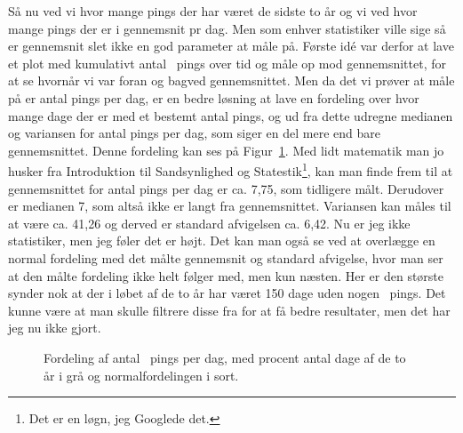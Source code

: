 \documentclass{article}
\newlength\myheight
\newlength\mydepth
\newcommand*\inlinegraphics[1]{%
  \settototalheight\myheight{Xygp}%
  \settodepth\mydepth{Xygp}%
  \raisebox{-\mydepth}{\texttt{[image: \#1]}}%
}
\newcommand{\coffee}[0]{\inlinegraphics{coffee.png}}
\begin{document}
Så nu ved vi hvor mange pings der har været de sidste to år og vi ved hvor mange pings der er i gennemsnit pr dag. Men som enhver statistiker ville sige så er gennemsnit slet ikke en god parameter at måle på.
Første idé var derfor at lave et plot med kumulativt antal \coffee\ pings over tid og måle op mod gennemsnittet, for at se hvornår vi var foran og bagved gennemsnittet.
Men da det vi prøver at måle på er antal pings per dag, er en bedre løsning at lave en fordeling over hvor mange dage der er med et bestemt antal pings, og ud fra dette udregne medianen og variansen for antal pings per dag, som siger en del mere end bare gennemsnittet. Denne fordeling kan ses på Figur~\ref{fig:days_count_distribution}.
Med lidt matematik man jo husker fra Introduktion til Sandsynlighed og Statestik\footnote{Det er en løgn, jeg Googlede det.}, kan man finde frem til at gennemsnittet for antal pings per dag er ca. 7,75, som tidligere målt. Derudover er medianen 7, som altså ikke er langt fra gennemsnittet. Variansen kan måles til at være ca. 41,26 og derved er standard afvigelsen ca. 6,42. Nu er jeg ikke statistiker, men jeg føler det er højt.
Det kan man også se ved at overlægge en normal fordeling med det målte gennemsnit og standard afvigelse, hvor man ser at den målte fordeling ikke helt følger med, men kun næsten.
Her er den største synder nok at der i løbet af de to år har været 150 dage uden nogen \coffee\ pings. Det kunne være at man skulle filtrere disse fra for at få bedre resultater, men det har jeg nu ikke gjort.

\begin{figure}[h!]
	\centering
	\resizebox{\linewidth}{!}{}
	\vspace{-15pt}
	\caption{Fordeling af antal \protect\coffee\ pings per dag, med procent antal dage af de to år i grå og normalfordelingen i sort.}
	\label{fig:days_count_distribution}
\end{figure}
\end{document}
